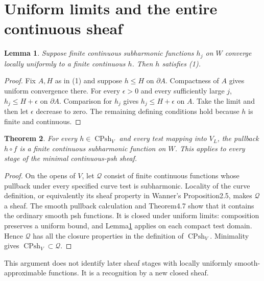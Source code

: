 \documentclass[11pt]{article}
\newtheorem{theorem}{Theorem}
\newtheorem{lemma}[theorem]{Lemma}
\newcommand{\CPsh}{\operatorname{CPsh}}
\begin{document}
\section{Uniform limits and the entire continuous sheaf}
\begin{lemma}\label{uniform}
Suppose finite continuous subharmonic functions $h_j$ on $W$ converge
locally uniformly to a finite continuous $h$. Then $h$ satisfies (1).
\end{lemma}
\begin{proof}
Fix $A,H$ as in (1) and suppose $h\le H$ on $\partial A$.
Compactness of $A$ gives uniform convergence there. For every $\epsilon>0$
and every sufficiently large $j$, $h_j\le H+\epsilon$ on $\partial A$.
Comparison for $h_j$ gives $h_j\le H+\epsilon$ on $A$. Take the limit and
then let $\epsilon$ decrease to zero. The remaining defining conditions
hold because $h$ is finite and continuous.
\end{proof}

\begin{theorem}\label{recognition}
For every $h\in\CPsh_V$ and every test mapping into $V_L$, the pullback
$h\circ f$ is a finite continuous subharmonic function on $W$.
This applies to every stage of the minimal continuous-psh sheaf.
\end{theorem}
\begin{proof}
On the opens of $V$, let $\mathcal Q$ consist of finite continuous
functions whose pullback under every specified curve test is subharmonic.
Locality of the curve definition, or equivalently its sheaf property
in Wanner's Proposition2.5, makes $\mathcal Q$ a sheaf.
The smooth pullback calculation and Theorem4.7 show that it contains the
ordinary smooth psh functions. It is closed under uniform limits:
composition preserves a uniform bound, and Lemma\ref{uniform} applies
on each compact test domain. Hence $\mathcal Q$ has all the closure
properties in the definition of $\CPsh_V$. Minimality gives
$\CPsh_V\subset\mathcal Q$.
\end{proof}
This argument does not identify later sheaf stages with locally uniformly
smooth-approximable functions. It is a recognition by a new closed sheaf.
\end{document}
